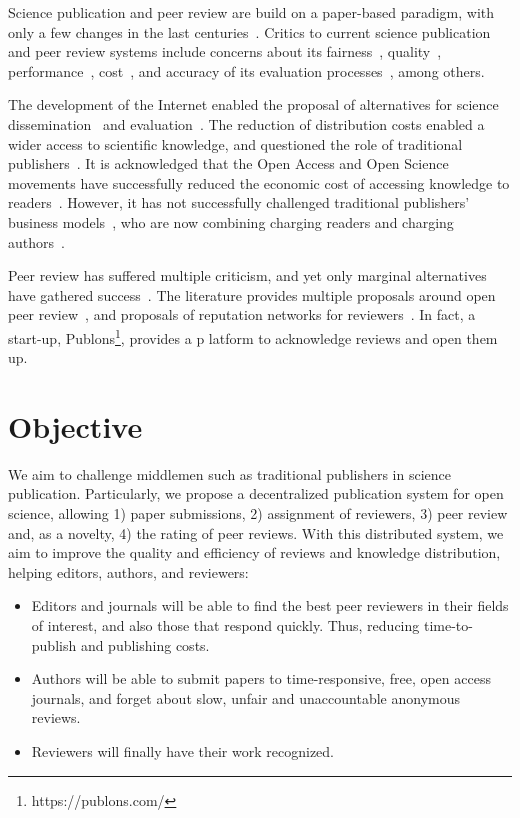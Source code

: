 Science publication and peer review are build on a paper-based paradigm, with
only a few changes in the last centuries~\cite{spier2002history}. Critics to
current science publication and peer review systems include concerns about its
fairness~\cite{wenneras2001nepotism}, quality~\cite{goldbeck1999evidence},
performance~\cite{huisman2017duration}, cost~\cite{bergstrom2004costs}, and
accuracy of its evaluation processes~\cite{doi:10.1001/jama.295.1.90}, among
others.

The development of the Internet enabled the proposal of alternatives for science
dissemination~\cite{eysenbach2006citation} and
evaluation~\cite{walker_emerging_2015}. The reduction of distribution costs
enabled a wider access to scientific knowledge, and questioned the role of
traditional publishers~\cite{ReinventingRigor}. It is acknowledged that the Open
Access and Open Science movements have successfully reduced the economic cost of
accessing knowledge to readers~\cite{evans2009open}. However, it has not
successfully challenged traditional publishers' business
models~\cite{lariviere2015oligopoly}, who are now combining charging readers and
charging authors~\cite{van2013true}.

Peer review has suffered multiple criticism, and yet only marginal alternatives
have gathered success~\cite{ware2008peer}. The literature provides multiple
proposals around open peer review~\cite{ford2013defining}, and proposals of
reputation networks for reviewers~\cite{frishauf2009reputation}. In fact, a
start-up, Publons\footnote{https://publons.com/}, provides a p latform to
acknowledge reviews and open them up.

\section{Objective}

We aim to challenge middlemen such as traditional publishers in science
publication. Particularly, we propose a decentralized publication system for
open science, allowing 1) paper submissions, 2) assignment of reviewers, 3) peer
review and, as a novelty, 4) the rating of peer reviews. With this distributed
system, we aim to improve the quality and efficiency of reviews and knowledge
distribution, helping editors, authors, and reviewers:
\begin{itemize}
\item Editors and journals will be able to find the best peer reviewers in their
  fields of interest, and also those that respond quickly. Thus, reducing
  time-to-publish and publishing costs.
\item Authors will be able to submit papers to time-responsive, free, open
  access journals, and forget about slow, unfair and unaccountable anonymous
  reviews.
\item Reviewers will finally have their work recognized.
\end{itemize}

